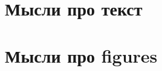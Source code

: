 

\section*{Мысли про текст}

\begin{enumerate}
	
	



\end{enumerate}



\section*{Мысли про figures}


